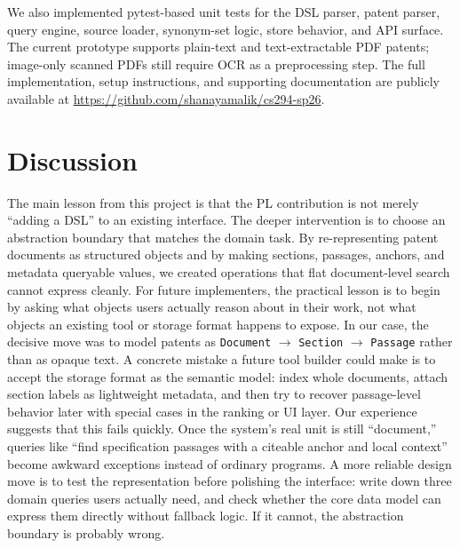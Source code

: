 \documentclass[sigconf]{acmart}
\newcommand{\DocSectionPassage}{\texttt{Document} $\to$ \texttt{Section} $\to$ \texttt{Passage}}
\begin{document}
We also implemented pytest-based unit tests for the DSL parser, patent parser,
query engine, source loader, synonym-set logic, store behavior, and API
surface. The current prototype supports plain-text and text-extractable PDF
patents; image-only scanned PDFs still require OCR as a preprocessing step. The
full implementation, setup instructions, and supporting documentation are
publicly available at \url{https://github.com/shanayamalik/cs294-sp26}.


\section{Discussion}

The main lesson from this project is that the PL contribution is not merely
``adding a DSL'' to an existing interface. The deeper intervention is to choose
an abstraction boundary that matches the domain task. By re-representing patent
documents as structured objects and by making sections, passages, anchors, and
metadata queryable values, we created operations that flat document-level
search cannot express cleanly. For future implementers, the practical lesson is
to begin by asking what objects users actually reason about in their work, not
what objects an existing tool or storage format happens to expose. In our case,
the decisive move was to model patents as
\DocSectionPassage{} rather than as opaque text. A concrete mistake a future
tool builder could make is to accept the storage format as the semantic model:
index whole documents, attach section labels as lightweight metadata, and then
try to recover passage-level behavior later with special cases in the ranking
or UI layer. Our experience suggests that this fails quickly. Once the system's
real unit is still ``document,'' queries like ``find specification passages
with a citeable anchor and local context'' become awkward exceptions instead of
ordinary programs. A more reliable design move is to test the representation
before polishing the interface: write down three domain queries users actually
need, and check whether the core data model can express them directly without
 fallback logic. If it cannot, the abstraction boundary is probably wrong.
\end{document}
